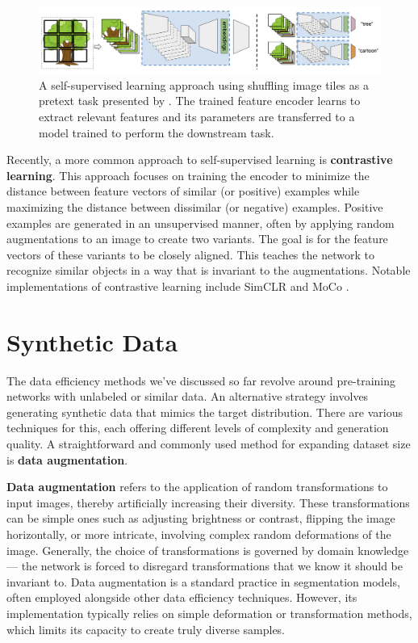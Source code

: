 \begin{figure}[h!]
 \centering
 \includegraphics[width=\linewidth]{images/3/shuffle-to-learn}
 \caption{A self-supervised learning approach using shuffling image tiles as a pretext task presented by \citet{carr2021shuffle}. The trained feature encoder learns to extract relevant features and its parameters are transferred to a model trained to perform the downstream task.}
 \label{fig:ssl-pretext}
\end{figure}

Recently, a more common approach to self-supervised learning is \textbf{contrastive learning}.
This approach focuses on training the encoder to minimize the distance between feature vectors of similar (or positive) examples while maximizing the distance between dissimilar (or negative) examples. Positive examples are generated in an unsupervised manner, often by applying random augmentations to an image to create two variants.  The goal is for the feature vectors of these variants to be closely aligned. This teaches the network to recognize similar objects in a way that is invariant to the augmentations. Notable implementations of contrastive learning include SimCLR \cite{chenSimpleFrameworkContrastive2020} and MoCo \cite{he2019moco}.

\section{Synthetic Data}

The data efficiency methods we've discussed so far revolve around pre-training networks with unlabeled or similar data. An alternative strategy involves generating synthetic data that mimics the target distribution. There are various techniques for this, each offering different levels of complexity and generation quality. A straightforward and commonly used method for expanding dataset size is \textbf{data augmentation}.

\textbf{Data augmentation} refers to the application of random transformations to input images, thereby artificially increasing their diversity. These transformations can be simple ones such as adjusting brightness or contrast, flipping the image horizontally, or more intricate, involving complex random deformations of the image. Generally, the choice of transformations is governed by domain knowledge --- the network is forced to disregard transformations that we know it should be invariant to. Data augmentation is a standard practice in segmentation models, often employed alongside other data efficiency techniques. However, its implementation typically relies on simple deformation or transformation methods, which limits its capacity to create truly diverse samples.

